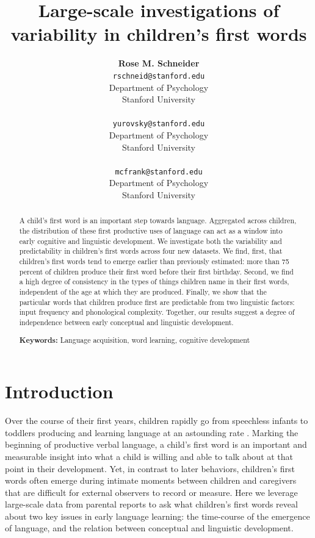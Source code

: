 \documentclass[10pt,letterpaper]{article}
\title{Large-scale investigations of variability in children's first words}
\author{{\large \bf Rose M. Schneider} \\ \texttt{rschneid@stanford.edu}\\ Department of Psychology \\ Stanford University \\ 
\And {\large \bf Daniel Yurovsky} \\ \texttt{yurovsky@stanford.edu} \\ Department of Psychology \\ Stanford University \\ 
\And {\large \bf Michael C. Frank} \\ \texttt{mcfrank@stanford.edu} \\ Department of Psychology \\ Stanford University \\ }
\begin{document}
\maketitle


\begin{abstract}
A child's first word is an important step towards language. Aggregated across children, the distribution of these first productive uses of language can act as a window into early cognitive and linguistic development. We investigate both the variability and predictability in children's first words across four new datasets. We find, first, that children's first words tend to emerge earlier than previously estimated: more than 75 percent of children produce their first word before their first birthday. Second, we find a high degree of consistency in the types of things children name in their first words, independent of the age at which they are produced. Finally, we show that the particular words that children produce first are predictable from two linguistic factors: input frequency and phonological complexity. Together, our results suggest a degree of independence between early conceptual and linguistic development.

\textbf{Keywords:}
Language acquisition, word learning, cognitive development
\end{abstract}

\section{Introduction}

Over the course of their first years, children rapidly go from speechless infants to toddlers producing and learning language at an astounding rate \cite{fenson1994}. Marking the beginning of productive verbal language, a child's first word is an important and measurable insight into what a child is willing and able to talk about at that point in their development. Yet, in contrast to later behaviors, children's first words often emerge during intimate moments between children and caregivers that are difficult for external observers to record or measure. Here we leverage large-scale data from parental reports to ask what children's first words reveal about two key issues in early language learning: the time-course of the emergence of language, and the relation between conceptual and linguistic development. 
\end{document}
